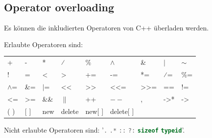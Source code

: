 

\subsection{Operator overloading}

Es können die inkludierten Operatoren von C++ überladen werden. 

Erlaubte Operatoren sind:\\
\begin{tabular}{lllllllll}
    +            & -               & *           & ⁄                      & \%                           & $\wedge$                & \&                            & $|$              & $\sim$          \\
    !            & =               & \textless{} & \textgreater{}         & +=                           & -=                      & *=                            & ⁄=               & \%=             \\
    $\wedge$=    & \&=             & $|$=        & \textless{}\textless{} & \textgreater{}\textgreater{} & \textless{}\textless{}= & \textgreater{}\textgreater{}= & ==               & !=              \\
    \textless{}= & \textgreater{}= & \&\&        & $\|$                   & ++                           & $--$                    & ,                             & -\textgreater{}* & -\textgreater{} \\
    ( )          & {[} {]}         & new         & delete                 & new{[} {]}                   & delete{[} {]}           &                               &                  &                
\end{tabular}\medskip

Nicht erlaubte Operatoren sind: '\lstinline[language=C++]|.| \quad \lstinline[language=C++]|.*| \quad \lstinline[language=C++]|::| \quad \lstinline[language=C++]|?:| \quad \lstinline[language=C++]|sizeof| \quad \lstinline[language=C++]|typeid|'.

